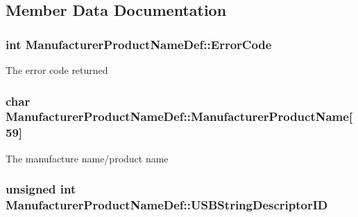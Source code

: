 \subsection{\-Member \-Data \-Documentation}
\hypertarget{struct_manufacturer_product_name_def_a826000ba27e897acf51b987c78d62861}{
\subsubsection[{\-Error\-Code}]{\setlength{\rightskip}{0pt plus 5cm}int {\bf \-Manufacturer\-Product\-Name\-Def\-::\-Error\-Code}}}\label{struct_manufacturer_product_name_def_a826000ba27e897acf51b987c78d62861}
\-The error code returned \hypertarget{struct_manufacturer_product_name_def_ae0bc4c8cdce9488bdb26da7850e7fe84}{
\subsubsection[{\-Manufacturer\-Product\-Name}]{\setlength{\rightskip}{0pt plus 5cm}char {\bf \-Manufacturer\-Product\-Name\-Def\-::\-Manufacturer\-Product\-Name}\mbox{[}59\mbox{]}}}\label{struct_manufacturer_product_name_def_ae0bc4c8cdce9488bdb26da7850e7fe84}
\-The manufacture name/product name \hypertarget{struct_manufacturer_product_name_def_a338f0d675fb05fabd7654239ca9b878d}{
\subsubsection[{\-U\-S\-B\-String\-Descriptor\-I\-D}]{\setlength{\rightskip}{0pt plus 5cm}unsigned int {\bf \-Manufacturer\-Product\-Name\-Def\-::\-U\-S\-B\-String\-Descriptor\-I\-D}}}\label{struct_manufacturer_product_name_def_a338f0d675fb05fabd7654239ca9b878d}
